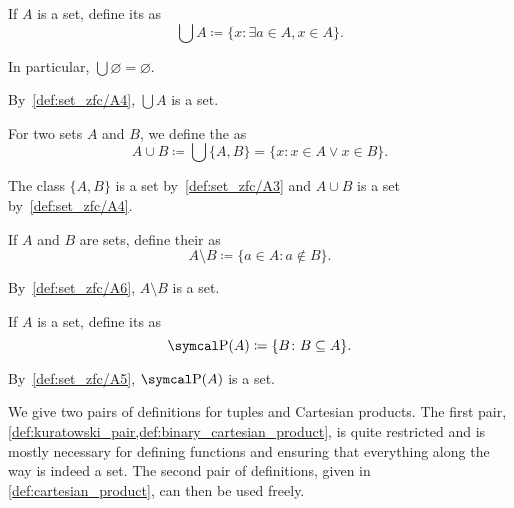\begin{definition}\label{def:set_union}\cite[24]{Enderton1977}
  If \( A \) is a set, define its  as
  \begin{equation*}
    \bigcup A \coloneqq \{ x \colon \exists a \in A, x \in A \}.
  \end{equation*}

  In particular, \( \bigcup \varnothing = \varnothing \).

  By~\ref{def:set_zfc/A4}, \( \bigcup A \) is a set.

  For two sets \( A \) and \( B \), we define the  as
  \begin{equation*}
    A \cup B \coloneqq \bigcup \{ A, B \} = \{ x \colon x \in A \lor x \in B \}.
  \end{equation*}

  The class \( \{ A, B \} \) is a set by~\ref{def:set_zfc/A3} and \( A \cup B \) is a set by~\ref{def:set_zfc/A4}.
\end{definition}

\begin{definition}\label{def:set_difference}\cite[27]{Enderton1977}
  If \( A \) and \( B \) are sets, define their  as
  \begin{equation*}
    A \setminus B \coloneqq \{ a \in A \colon a \not\in B \}.
  \end{equation*}

  By~\ref{def:set_zfc/A6}, \( A \setminus B \) is a set.
\end{definition}

\begin{definition}\label{def:power_set}\cite[19]{Enderton1977}
  If \( A \) is a set, define its  as
  \begin{equation*}
    \Power(A) \coloneqq \{ B \colon B \subseteq A \}.
  \end{equation*}

  By~\ref{def:set_zfc/A5}, \( \Power(A) \) is a set.
\end{definition}

\begin{remark}
  We give two pairs of definitions for tuples and Cartesian products. The first pair, \cref{def:kuratowski_pair,def:binary_cartesian_product}, is quite restricted and is mostly necessary for defining functions and ensuring that everything along the way is indeed a set. The second pair of definitions, given in \cref{def:cartesian_product}, can then be used freely.
\end{remark}

